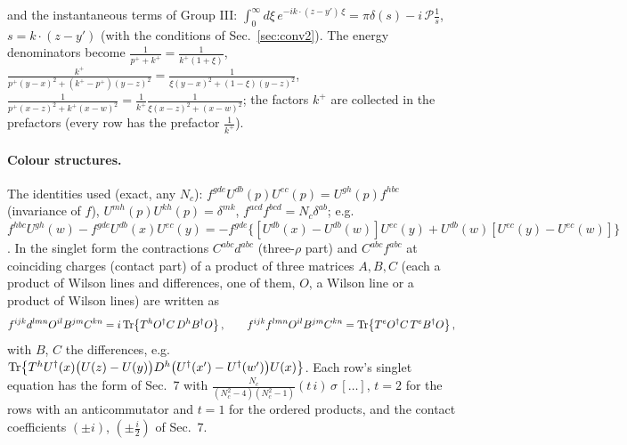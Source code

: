 and the instantaneous terms of Group III: $\int_{0}^{\infty}d\xi\,e^{-ik\cdot(z-y')\,\xi}=\pi\delta(s)-i\,\mathcal{P}\frac{1}{s}$, $s=k\cdot(z-y')$ (with the conditions of Sec.~\ref{sec:conv2}). The energy denominators become $\frac{1}{p^{+}+k^{+}}=\frac{1}{k^{+}(1+\xi)}$, $\frac{k^{+}}{p^{+}(y-x)^{2}+(k^{+}-p^{+})(y-z)^{2}}=\frac{1}{\xi(y-x)^{2}+(1-\xi)(y-z)^{2}}$, $\frac{1}{p^{+}(x-z)^{2}+k^{+}(x-w)^{2}}=\frac{1}{k^{+}}\frac{1}{\xi(x-z)^{2}+(x-w)^{2}}$; the factors $k^{+}$ are collected in the prefactors (every row has the prefactor $\frac{1}{k^{+}}$).

\paragraph*{Colour structures.} The identities used (exact, any $N_{c}$): $f^{gde}U^{db}(p)U^{ec}(p)=U^{gh}(p)f^{hbc}$ (invariance of $f$), $U^{mh}(p)U^{kh}(p)=\delta^{mk}$, $f^{acd}f^{bcd}=N_{c}\delta^{ab}$; e.g.\ $f^{hbc}U^{gh}(w)-f^{gde}U^{db}(x)U^{ec}(y)=-f^{gde}\big\{[U^{db}(x)-U^{db}(w)]U^{ec}(y)+U^{db}(w)[U^{ec}(y)-U^{ec}(w)]\big\}$. In the singlet form the contractions $C^{abc}d^{abc}$ (three-$\rho$ part) and $C^{abc}f^{abc}$ at coinciding charges (contact part) of a product of three matrices $A,B,C$ (each a product of Wilson lines and differences, one of them, $O$, a Wilson line or a product of Wilson lines) are written as
\begin{align}
f^{ijk}d^{lmn}O^{il}B^{jm}C^{kn}=i\,{\rm Tr}\big\{T^{h}O^{\dagger}C\,D^{h}B^{\dagger}O\big\}\,,\qquad f^{ijk}f^{lmn}O^{il}B^{jm}C^{kn}={\rm Tr}\big\{T^{e}O^{\dagger}C\,T^{e}B^{\dagger}O\big\}\,,\notag
\end{align}
with $B$, $C$ the differences, e.g.\ ${\rm Tr}\big\{T^{h}U^{\dagger}(x)\big(U(z)-U(y)\big)D^{h}\big(U^{\dagger}(x')-U^{\dagger}(w')\big)U(x)\big\}$. Each row's singlet equation has the form of Sec.~7 with $\frac{N_{c}}{(N_{c}^{2}-4)(N_{c}^{2}-1)}(t\,i)\,\sigma\,[\dots]$, $t=2$ for the rows with an anticommutator and $t=1$ for the ordered products, and the contact coefficients $(\pm i)$, $(\pm\frac{i}{2})$ of Sec.~7.

